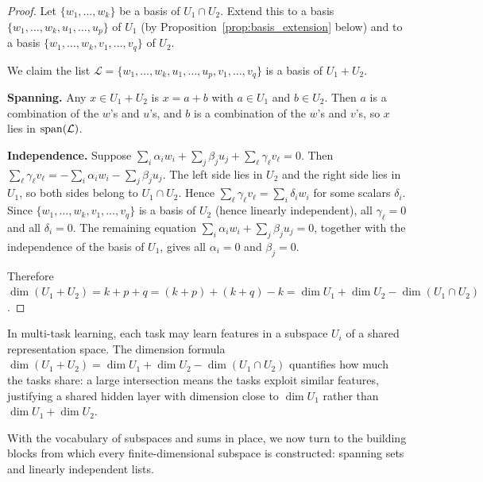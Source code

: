 \documentclass[11pt,a4paper]{article}
\begin{document}
\begin{proof}
Let $\{w_1, \ldots, w_k\}$ be a basis of $U_1 \cap U_2$.  Extend this to a
basis $\{w_1, \ldots, w_k, u_1, \ldots, u_p\}$ of $U_1$ (by
Proposition~\ref{prop:basis_extension} below) and to a basis
$\{w_1, \ldots, w_k, v_1, \ldots, v_q\}$ of $U_2$.

We claim the list
$\mathcal{L} = \{w_1, \ldots, w_k, u_1, \ldots, u_p, v_1, \ldots, v_q\}$
is a basis of $U_1 + U_2$.

\textbf{Spanning.}\; Any $x \in U_1 + U_2$ is $x = a + b$ with $a \in U_1$
and $b \in U_2$.  Then $a$ is a combination of the $w$'s and $u$'s, and $b$
is a combination of the $w$'s and $v$'s, so $x$ lies in $\operatorname{span}(\mathcal{L})$.

\textbf{Independence.}\; Suppose
$\sum_{i} \alpha_i w_i + \sum_{j} \beta_j u_j + \sum_{\ell} \gamma_\ell v_\ell = 0$.
Then $\sum_\ell \gamma_\ell v_\ell = -\sum_i \alpha_i w_i - \sum_j \beta_j u_j$.
The left side lies in $U_2$ and the right side lies in $U_1$, so both sides
belong to $U_1 \cap U_2$.  Hence $\sum_\ell \gamma_\ell v_\ell
= \sum_i \delta_i w_i$ for some scalars $\delta_i$.  Since
$\{w_1, \ldots, w_k, v_1, \ldots, v_q\}$ is a basis of $U_2$ (hence linearly
independent), all $\gamma_\ell = 0$ and all $\delta_i = 0$.  The remaining
equation $\sum_i \alpha_i w_i + \sum_j \beta_j u_j = 0$, together with the
independence of the basis of $U_1$, gives all $\alpha_i = 0$ and $\beta_j = 0$.

Therefore $\dim(U_1 + U_2) = k + p + q = (k+p) + (k+q) - k
= \dim U_1 + \dim U_2 - \dim(U_1 \cap U_2)$.
\end{proof}

\begin{rlconnection}[title={Feature Subspaces in Representation Learning}]
In multi-task learning, each task may learn features in a subspace $U_i$ of
a shared representation space.  The dimension formula
$\dim(U_1 + U_2) = \dim U_1 + \dim U_2 - \dim(U_1 \cap U_2)$ quantifies
how much the tasks share: a large intersection means the tasks exploit
similar features, justifying a shared hidden layer with dimension close
to $\dim U_1$ rather than $\dim U_1 + \dim U_2$.
\end{rlconnection}

With the vocabulary of subspaces and sums in place, we now turn to the
building blocks from which every finite-dimensional subspace is constructed:
spanning sets and linearly independent lists.

\end{document}
